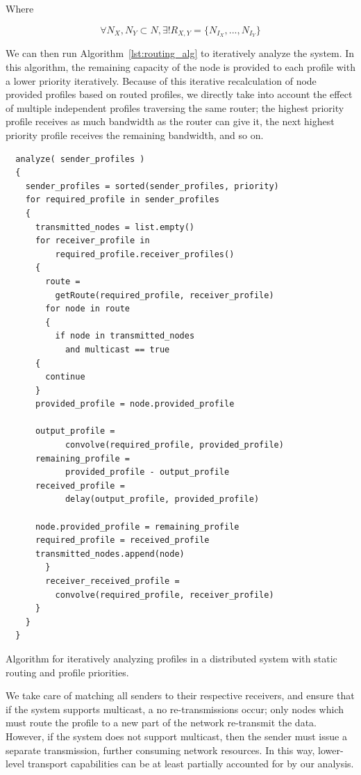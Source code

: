 Where

\begin{equation}
  \forall N_X,N_Y \subset N, \exists! R_{X,Y} = \{N_{I_X},...,N_{I_Y}\}
\end{equation}

We can then run Algorithm~\ref{lst:routing_alg} to iteratively analyze
the system.  In this algorithm, the remaining capacity of the node is
provided to each profile with a lower priority iteratively.  Because
of this iterative recalculation of node provided profiles based on
routed profiles, we directly take into account the effect of multiple
independent profiles traversing the same router; the highest priority
profile receives as much bandwidth as the router can give it, the next
highest priority profile receives the remaining bandwidth, and so on.

\begin{listing}[ht!]
  \begin{verbatim}
  analyze( sender_profiles )
  {
    sender_profiles = sorted(sender_profiles, priority)
    for required_profile in sender_profiles
    {
      transmitted_nodes = list.empty() 
      for receiver_profile in
          required_profile.receiver_profiles()
      {
        route =
          getRoute(required_profile, receiver_profile)
        for node in route
        {
          if node in transmitted_nodes
            and multicast == true
	  {
	    continue
	  }
	  provided_profile = node.provided_profile
            
	  output_profile =
            convolve(required_profile, provided_profile)
	  remaining_profile =
            provided_profile - output_profile
	  received_profile =
            delay(output_profile, provided_profile)
            
	  node.provided_profile = remaining_profile
	  required_profile = received_profile
	  transmitted_nodes.append(node)
        }
        receiver_received_profile =
          convolve(required_profile, receiver_profile)
      }
    }
  }
  \end{verbatim}
  \caption{Algorithm for iteratively analyzing profiles in a
    distributed system with static routing and profile priorities.}
  \label{lst:routing_alg}
\end{listing}

We take care of matching all senders to their respective receivers,
and ensure that if the system supports multicast, a no re-transmissions
occur; only nodes which must route the profile to a new part of the
network re-transmit the data.  However, if the system does not support
multicast, then the sender must issue a separate transmission, further
consuming network resources.  In this way, lower-level transport
capabilities can be at least partially accounted for by our analysis.

